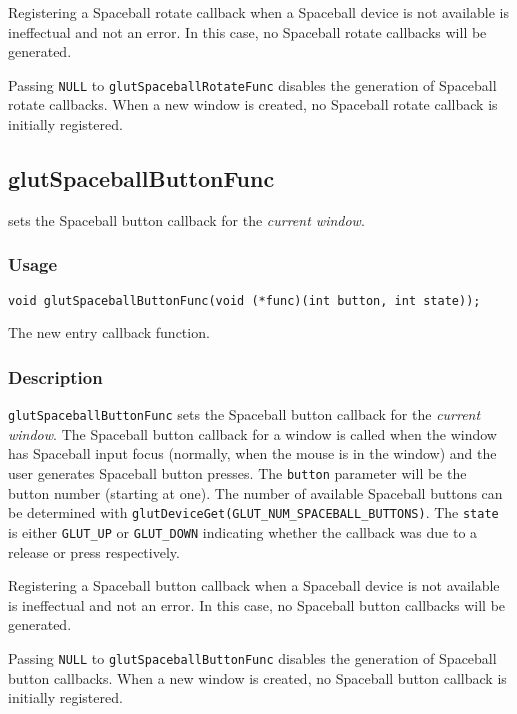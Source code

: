 Registering a Spaceball rotate callback when a Spaceball device is not available
is ineffectual and not an error.  In this case, no Spaceball rotate callbacks
will be generated.

Passing {\tt NULL} to {\tt glutSpaceballRotateFunc} disables the generation of
Spaceball rotate callbacks.  When a new window is created, no
Spaceball rotate callback is initially registered.

\subsection{glutSpaceballButtonFunc}

 sets the Spaceball button callback for
the {\em current window}.

\subsubsection*{Usage}
\begin{verbatim}
void glutSpaceballButtonFunc(void (*func)(int button, int state));
\end{verbatim}
\begin{description}
\itemsep 0in
\item[\tt func]
The new entry callback function.
\end{description}

\subsubsection*{Description}

{\tt glutSpaceballButtonFunc} sets the Spaceball button callback for the {\em
current window}.  The Spaceball button callback for a window is called when the
window has Spaceball input focus (normally, when the mouse is in the window)
and the user generates Spaceball button presses.  The {\tt button} parameter
will be the button number (starting at one).  The number of available Spaceball
buttons can be determined with {\tt glutDeviceGet(GLUT\_NUM\_SPACEBALL\_BUTTONS)}.
The {\tt state} is either {\tt GLUT\_UP} or {\tt GLUT\_DOWN} indicating whether
the callback was due to a release or press respectively.

Registering a Spaceball button callback when a Spaceball device is not available
is ineffectual and not an error.  In this case, no Spaceball button callbacks
will be generated.

Passing {\tt NULL} to {\tt glutSpaceballButtonFunc} disables the generation of
Spaceball button callbacks.  When a new window is created, no
Spaceball button callback is initially registered.

